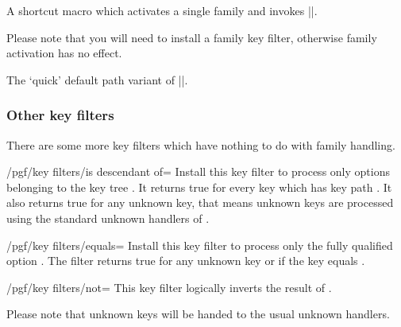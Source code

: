 \begin{command}{\pgfkeysactivatesinglefamilyandfilteroptions{}}%
	A shortcut macro which activates a single family and invokes |\pgfkeysfiltered|.

	Please note that you will need to install a family key filter, otherwise family activation has no effect.
\end{command}
\begin{command}{\pgfqkeysactivatesinglefamilyandfilteroptions{}}%
	The `quick' default path variant of |\pgfkeysactivatesinglefamilyandfilteroptions|.
\end{command}

\subsubsection{Other key filters}
There are some more key filters which have nothing to do with family handling.
\begin{key}{/pgf/key filters/is descendant of=}
	Install this key filter to process only options belonging to the key tree . It returns true for every key which has key path . It also returns true for any unknown key, that means unknown keys are processed using the standard unknown handlers of \pgfname.
\begin{codeexample}[]
\end{codeexample}
\end{key}

\begin{key}{/pgf/key filters/equals=}
	Install this key filter to process only the fully qualified option . The filter returns true for any unknown key or if the key equals .
\begin{codeexample}[]
\end{codeexample}
\end{key}

\begin{key}{/pgf/key filters/not=}
	This key filter logically inverts the result of .
\begin{codeexample}[]
\end{codeexample}
	Please note that unknown keys will be handed to the usual unknown handlers.
\end{key}

